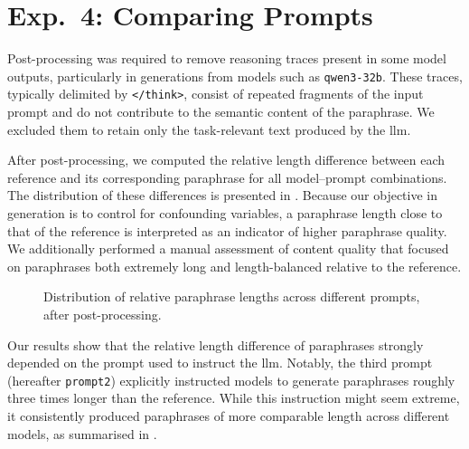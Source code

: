 \section{Exp.\ 4: Comparing Prompts}%
\label{subsec:prompt_impact_res}


Post-processing was required to remove reasoning traces present in some model outputs, particularly in generations from models such as \texttt{qwen3-32b}. 
These traces, typically delimited by \texttt{</think>}, consist of repeated fragments of the input prompt and do not contribute to the semantic content of the paraphrase. 
We excluded them to retain only the task-relevant text produced by the \ac{llm}.

After post-processing, we computed the relative length difference between each reference and its corresponding paraphrase for all model–prompt combinations. 
The distribution of these differences is presented in . 
Because our objective in \imp{} generation is to control for confounding variables, a paraphrase length close to that of the reference is interpreted as an indicator of higher paraphrase quality. 
We additionally performed a manual assessment of content quality that focused on paraphrases both extremely long and length-balanced relative to the reference.

\begin{figure}[htbp]
    \centering
    
    \caption[Impact of different prompts on paraphrases.]{
    Distribution of relative paraphrase lengths across different prompts, after post-processing.    
    }
    \label{fig:prompt_impact_post_processed}
\end{figure}

Our results show that the relative length difference of paraphrases strongly depended on the prompt used to instruct the \ac{llm}. 
Notably, the third prompt (hereafter \texttt{prompt2}) explicitly instructed models to generate paraphrases roughly three times longer than the reference. 
While this instruction might seem extreme, it consistently produced paraphrases of more comparable length across different models, as summarised in .

